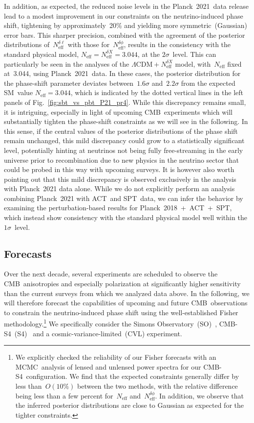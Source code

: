 \documentclass[11pt]{article}
\numberwithin{equation}{section}
\newcommand{\Neff}{N_\mathrm{eff}}
\newcommand{\Nphase}{N_\mathrm{eff}^{\delta\phi}}
\newcommand{\Nmultipole}{N_\mathrm{eff}^{\delta\ell}}
\begin{document}
In addition, as expected, the reduced noise levels in the Planck~2021~data release lead to a modest improvement in our constraints on the neutrino-induced phase shift, tightening by approximately~20\% and yielding more symmetric~(Gaussian) error bars. This sharper precision, combined with the agreement of the posterior distributions of~$\Nmultipole$ with those for~$\Nphase$, results in the consistency with the standard physical model, $\Neff = \Neff^{\delta X} = 3.044$, at the $2\sigma$~level. This can particularly be seen in the analyses of the $\Lambda\mathrm{CDM} + \Neff^{\delta X}$ model, with~$\Neff$ fixed at~3.044, using Planck~2021~data. In these cases, the posterior distribution for the phase-shift parameter deviates between~$1.6\sigma$ and~$2.2\sigma$ from the expected SM~value $\Neff=3.044$, which is indicated by the dotted vertical lines in the left panels of Fig.~\ref{fig:sbt_vs_pbt_P21_pr4}. While this discrepancy remains small, it is intriguing, especially in light of upcoming CMB~experiments which will substantially tighten the phase-shift constraints as we will see in the following. In this sense, if the central values of the posterior distributions of the phase shift remain unchanged, this mild discrepancy could grow to a statistically significant level, potentially hinting at neutrinos not being fully free-streaming in the early universe prior to recombination due to new physics in the neutrino sector that could be probed in this way with upcoming surveys. It is however also worth pointing out that this mild discrepancy is observed exclusively in the analysis with Planck~2021 data alone. While we do not explicitly perform an analysis combining Planck~2021 with ACT~and SPT~data, we can infer the behavior by examining the perturbation-based results for \mbox{Planck~2018 + ACT + SPT}, which instead show consistency with the standard physical model well within the $1\sigma$~level.


\subsection{Forecasts}
\label{sec:forecasts}

Over the next decade, several experiments are scheduled to observe the CMB~anisotropies and especially polarization at significantly higher sensitivity than the current surveys from which we analyzed data above. In the following, we will therefore forecast the capabilities of upcoming and future CMB~observations to constrain the neutrino-induced phase shift using the well-established Fisher methodology.\footnote{We explicitly checked the reliability of our Fisher forecasts with an MCMC~analysis of lensed and unlensed power spectra for our \mbox{CMB-S4}~configuration. We find that the expected constraints generally differ by less than~$O(10\%)$ between the two methods, with the relative difference being less than a few percent for~$\Neff$ and~$\Nphase$. In addition, we observe that the inferred posterior distributions are close to Gaussian as expected for the tighter constraints.} We specifically consider the Simons Observatory~(SO)~\cite{SimonsObservatory:2018koc}, \mbox{\mbox{CMB-S4}}~(S4)~\cite{Abazajian:2019eic, CMB-S4:2022ght} and a cosmic-variance-limited~(CVL) experiment.\medskip
\end{document}
